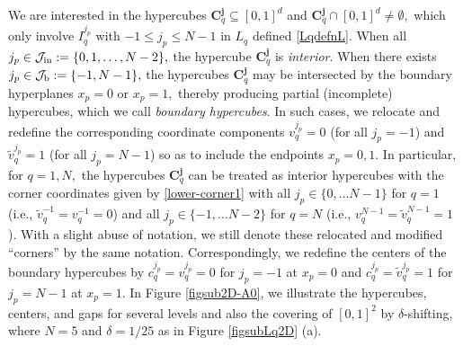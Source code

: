 \documentclass[10pt,reqno,final]{amsart}
\theoremstyle{remark}
\theoremstyle{definition}
\newcommand{\bs}[1]{\boldsymbol{#1}}
\newcommand{\comm}[1]{\marginpar{%
\vskip-\baselineskip %
\raggedright\footnotesize
\itshape\hrule\smallskip {\color{blue}{#1}}\par\smallskip\hrule}}
\newcommand{\wll}[1]{#1}
\begin{document}
We are  interested in the hypercubes  
$\bs C^{\bs j}_q\subseteq [0,1]^d$ and $\bs C_q^{\bs j}\cap [0,1]^d\not=\emptyset,$ which only involve 
$I_q^{j_p}$ with 
$-1\le j_p\le N-1$  in $L_q$ defined 
\eqref{LqdefnL}.  When all $j_p\in {\mathcal J}_{\rm in}:=\{0,1,\ldots, N-2\},$ the hypercube $\bs C_q^{\bs j}$ is  \emph{interior}. When there exists $j_p\in {\mathcal J}_{\rm b}:=\{-1, N-1\},$ the hypercubes $\bs C^{\bs j}_q$ may be intersected by the boundary hyperplanes $x_p=0$ or $x_p=1,$ thereby producing partial (incomplete) hypercubes, which we call \emph{boundary hypercubes}. 
\wll{In such cases, we relocate and redefine the corresponding coordinate components   $v_q^{j_p}=0$ (for all $j_p=-1$) and $\tilde v_q^{j_p}=1$ (for all $j_p=N-1$) so as to include the endpoints $x_p=0,1$.  
In particular,  for $q=1,N,$ the hypercubes $\bs C_q^{\bs j}$  can be treated as interior hypercubes with the corner coordinates given by  \eqref{lower-corner1} with all $j_p\in \{0,\ldots N-1\}$ for $q=1$   (i.e., $\tilde v_q^{-1}= v_q^{-1}=0$)
and  all $j_p\in \{-1,\ldots N-2\}$ for $q=N$ (i.e., $v_q^{N-1}=\tilde v_q^{N-1}=1$).  
With a slight abuse of notation, we still denote these relocated and modified ``corners'' by the same notation. Correspondingly, we redefine the centers of the boundary hypercubes by $c_q^{j_p}=v_q^{j_p}=0$ for $j_p=-1$ at $x_p=0$ and $c_q^{j_p}=\tilde v_q^{j_p}=1$ for $j_p=N-1$ at $x_p=1.$}   In Figure \ref{figsub2D-A0}, we illustrate the hypercubes, centers, and gaps for several levels and also the covering of $[0,1]^2$ by $\delta$-shifting, where $N=5$ and $\delta=1/25$ as in  Figure \ref{figsubLq2D} (a).
\end{document}

